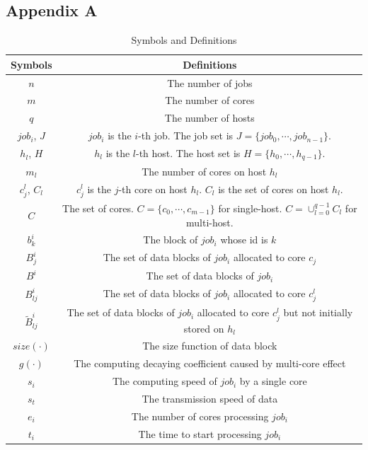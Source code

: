 \documentclass{llncs}
\begin{document}
	\newpage
	\begin{appendices}
		\section*{Appendix A}
		\begin{table}[H]
			\caption{Symbols and Definitions}
			\begin{center}
				\begin{tabular}{c|c}
					\toprule
					\textbf{Symbols} &\textbf{Definitions}  \\
					\midrule
					$n$ & The number of jobs  \\ 
					$m$ & The number of cores \\
					$q$ & The number of hosts  \\ 
					$job_i$, $J$ & $job_i$ is the $i$-th job. The job set is $J=\{job_0, \cdots, job_{n-1}\}$. \\ 
					$h_l$, $H$ & $h_l$ is the $l$-th  host. The host set is $H=\{h_0, \cdots, h_{q-1}\}$. \\ 
					$m_l$ & The number of cores on host $h_l$\\
					$c^l_j$, $C_l$ & $c^l_j$ is the $j$-th core on host $h_l$. $C_l$ is the set of cores on host $h_l$.\\ 
					$C$ & The set of cores. $C=\{c_0,\cdots,c_{m-1}\}$ for single-host. $C=\cup_{l=0}^{q-1} C_l$ for multi-host.\\
					$b^i_k$& The block of $job_i$ whose id is $k$\\
					$B^i_{j}$ & The set of data blocks of $job_i$ allocated to core $c_j$ \\
					$B^i$ & The set of data blocks of $job_i$ \\ 
					$B^i_{lj}$ & The set of data blocks of $job_i$ allocated to core $c^l_j$ \\
					$\widetilde{B}^i_{lj}$ & The set of data blocks of $job_i$ allocated to core $c^l_j$ but not initially stored on $h_l$\\
					$size(\cdot)$ & The size function of data block\\
					$g(\cdot)$ &  The computing decaying coefficient caused by multi-core effect\\
					$s_i$ & The computing speed of $job_i$ by a single core\\
					$s_t$ & The transmission speed of data \\
					$e_i$ & The number of cores processing $job_i$\\ 
					$t_i$ & The time to start processing $job_i$\\

\end{tabular}
\end{center}
\end{table}
\end{appendices}
\end{document}

